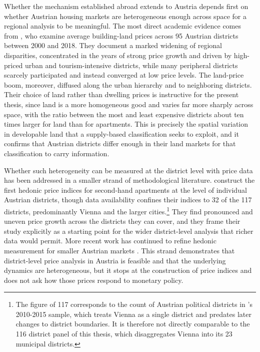 \documentclass[a4paper,12pt, headsepline]{scrartcl}
\numberwithin{equation}{section}
\begin{document}
Whether the mechanism established abroad extends to Austria depends first on whether Austrian housing markets are heterogeneous enough across space for a regional analysis to be meaningful. The most direct academic evidence comes from \citet{reiner2023}, who examine average building-land prices across 95 Austrian districts between 2000 and 2018. They document a marked widening of regional disparities, concentrated in the years of strong price growth and driven by high-priced urban and tourism-intensive districts, while many peripheral districts scarcely participated and instead converged at low price levels. The land-price boom, moreover, diffused along the urban hierarchy and to neighboring districts. Their choice of land rather than dwelling prices is instructive for the present thesis, since land is a more homogeneous good and varies far more sharply across space, with the ratio between the most and least expensive districts about ten times larger for land than for apartments. This is precisely the spatial variation in developable land that a supply-based classification seeks to exploit, and it confirms that Austrian districts differ enough in their land markets for that classification to carry information.

Whether such heterogeneity can be measured at the district level with price data has been addressed in a smaller strand of methodological literature. \citet{mundt2017} construct the first hedonic price indices for second-hand apartments at the level of individual Austrian districts, though data availability confines their indices to 32 of the 117 districts, predominantly Vienna and the larger cities.\footnote{The figure of 117 corresponds to the count of Austrian political districts in \citet{mundt2017}'s 2010-2015 sample, which treats Vienna as a single district and predates later changes to district boundaries. It is therefore not directly comparable to the 116 district panel of this thesis, which disaggregates Vienna into its 23 municipal districts.} They find pronounced and uneven price growth across the districts they can cover, and they frame their study explicitly as a starting point for the wider district-level analysis that richer data would permit. More recent work has continued to refine hedonic measurement for smaller Austrian markets \citep{spiegel2025}. This strand demonstrates that district-level price analysis in Austria is feasible and that the underlying dynamics are heterogeneous, but it stops at the construction of price indices and does not ask how those prices respond to monetary policy.
\end{document}
